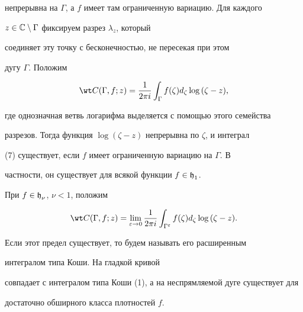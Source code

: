 непрерывна на $\Gamma$, а $f$ имеет там ограниченную вариацию. Для каждого


$z\in {\Bbb C}\setminus\Gamma$ фиксируем разрез $\lambda_z$, который


соединяет эту точку с бесконечностью, не пересекая при этом


дугу $\Gamma$. Положим


\begin{equation}


\wt C(\Gamma,f;z) = \frac{1}{2\pi i}\int_{\Gamma}


{f(\zeta)d_{\zeta}\log{(\zeta-z)}},


\end{equation}


где однозначная ветвь логарифма выделяется с помощью этого семейства


разрезов. Тогда функция $\log{(\zeta - z)}$ непрерывна по $\zeta$, и интеграл


(7) существует, если $f$ имеет ограниченную вариацию на $\Gamma$. В


частности, он существует для всякой функции $f\in\operatorname{\frak h}_1$.


При $f\in\operatorname{\frak h}_{\nu}$, $\nu<1$, положим


\begin{equation}


\wt C(\Gamma,f;z) = \lim_{\varepsilon\to 0}{\frac{1}{2\pi i}


\int_{\Gamma^\varepsilon}{f(\zeta)d_{\zeta}\log{(\zeta-z)}}}.


\end{equation}


Если этот предел существует, то будем называть его расширенным


интегралом типа Коши. На гладкой кривой


совпадает с интегралом типа Коши (1), а на неспрямляемой дуге существует для


достаточно обширного класса плотностей $f$.





